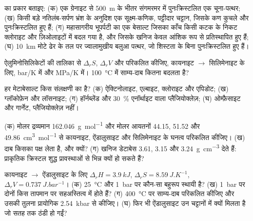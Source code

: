 \begin{exercise}[$\star$]\label{exo:b2:metamorphic-facies:1}
 का प्रकार बताइए: (क) एक ग्रेनाइट से
\qty{500}{m} के भीतर संगमरमर में पुनःक्रिस्टलित एक चूना-पत्थर; (ख) किसी बड़े नतिलंब-सर्पण
भ्रंश के अनुदिश एक सूक्ष्म-कणिक, पट्टीदार चट्टान, जिसके कण कुचले और पुनःक्रिस्टलित हुए हैं; (ग) महासागरीय भूपर्पटी का एक बेसाल्ट जिसका
काँच किसी कटक के निकट क्लोराइट और ज़िओलाइटों में बदल गया है, और जिसके खनिज केवल आंशिक रूप से
प्रतिस्थापित हुए हैं; (घ) \qty{10}{km} मोटे ढेर के तल पर ज्वालामुखीय बलुआ पत्थर,
जो शिस्टता के बिना पुनःक्रिस्टलित हुए हैं।
\end{exercise}

\begin{exercise}[$\star$]\label{exo:b2:metamorphic-facies:2}
ऐलुमिनोसिलिकेटों की तालिका से $\Delta_r S$, $\Delta_r V$ और  परिकलित कीजिए,
कायनाइट $\to$ सिलिमेनाइट के लिए, \unit{bar/K} में और \unit{MPa/K} में। \qty{100}{\celsius} में
साम्य-दाब कितना बदलता है?
\end{exercise}

\begin{exercise}[$\star$]\label{exo:b2:metamorphic-facies:3}
हर मेटाबेसाल्ट किस संलक्षणी का है? (क) ऐक्टिनोलाइट, एल्बाइट, क्लोराइट और
एपिडोट; (ख) ग्लॉकोफ़ेन और लॉसनाइट; (ग) हॉर्नब्लेंड और
\qty{30}{\percent} एनॉर्थाइट वाला प्लैजियोक्लेज़; (घ) ओम्फ़ैसाइट और गार्नेट, प्लैजियोक्लेज़ नहीं।
\end{exercise}

\begin{exercise}[$\star$]\label{exo:b2:metamorphic-facies:4}
(क) मोलर द्रव्यमान \qty{162.046}{g.mol^{-1}} और मोलर आयतनों 44.15, 51.52 और
\qty{49.86}{cm^3.mol^{-1}} से कायनाइट, ऐंडालुसाइट और सिलिमेनाइट के घनत्व परिकलित कीजिए।
(ख) दाब किसका पक्ष लेता है, और क्यों? (ग) खनिज डेटाबेस 3.61, 3.15 और
\qty{3.24}{g.cm^{-3}} देते हैं: प्राकृतिक क्रिस्टल शुद्ध प्रावस्थाओं से भिन्न क्यों हो सकते हैं?
\end{exercise}

\begin{exercise}[$\star\star$]\label{exo:b2:metamorphic-facies:5}
कायनाइट $\to$ ऐंडालुसाइट के लिए $\Delta_r H = \qty{3.9}{kJ}$, $\Delta_r S =
\qty{8.59}{J.K^{-1}}$, $\Delta_r V = \qty{0.737}{J.bar^{-1}}$। (क) \qty{25}{\celsius} और \qty{1}{bar} पर
कौन-सा बहुरूप स्थायी है? (ख) \qty{1}{bar} पर दोनों किस तापमान पर
सहअस्तित्व में होते हैं? (ग) \qty{400}{\celsius} पर साम्य-दाब परिकलित कीजिए और
उसकी तुलना प्रायोगिक \qty{2.54}{kbar} से कीजिए। (घ) फिर भी ऐंडालुसाइट उन चट्टानों में क्यों
मिलता है जो सतह तक ठंडी हो गईं?
\end{exercise}


